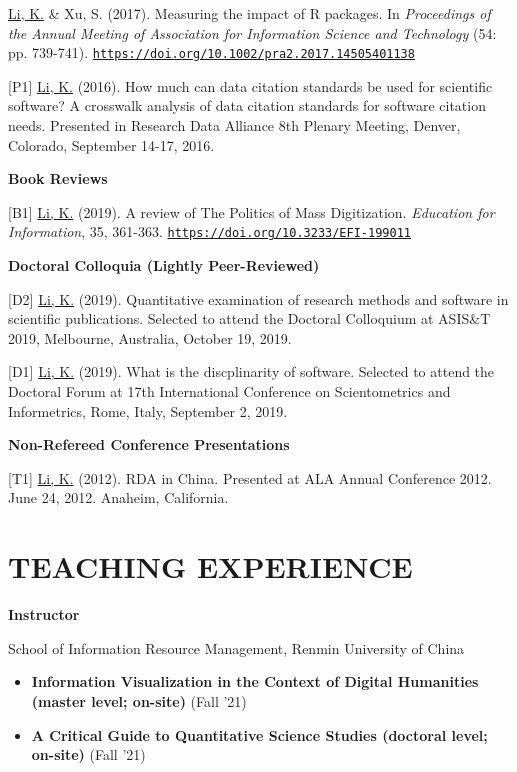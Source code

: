 \documentclass[margin, 10pt]{res} %
\begin{document}
\begin{resume}
[P2] \underline{Li, K.} \& Xu, S. (2017). Measuring the impact of R packages. In \textit{Proceedings of the Annual Meeting of Association for Information Science and Technology} (54: pp. 739-741). \href{https://doi.org/10.1002/pra2.2017.14505401138}{\nolinkurl{https://doi.org/10.1002/pra2.2017.14505401138}}

[P1] \underline{Li, K.} (2016). How much can data citation standards be used for scientific software? A crosswalk analysis of data citation standards for software citation needs. Presented in Research Data Alliance 8th Plenary Meeting, Denver, Colorado, September 14-17, 2016.

\textbf{Book Reviews}

[B1] \underline{Li, K.} (2019). A review of The Politics of Mass Digitization. \textit{Education for Information}, 35, 361-363. \href{https://doi.org/10.3233/EFI-199011}{\nolinkurl{https://doi.org/10.3233/EFI-199011}}

\textbf{Doctoral Colloquia (Lightly Peer-Reviewed)}

[D2] \underline{Li, K.} (2019). Quantitative examination of research methods and software in scientific publications. Selected to attend the Doctoral Colloquium at ASIS\&T 2019, Melbourne, Australia, October 19, 2019.

[D1] \underline{Li, K.} (2019). What is the discplinarity of software. Selected to attend the Doctoral Forum at 17th International Conference on Scientometrics and Informetrics, Rome, Italy, September 2, 2019.

\textbf{Non-Refereed Conference Presentations}

[T1] \underline{Li, K.} (2012). RDA in China. Presented at ALA Annual Conference 2012. June 24, 2012. Anaheim, California.

\section{TEACHING EXPERIENCE}

\textbf{Instructor}

School of Information Resource Management, Renmin University of China
\begin{itemize}
\item \textbf{Information Visualization in the Context of Digital Humanities (master level; on-site)} (Fall '21)
\item \textbf{A Critical Guide to Quantitative Science Studies (doctoral level; on-site)} (Fall '21)
\end{itemize}


\end{resume}
\end{document}
